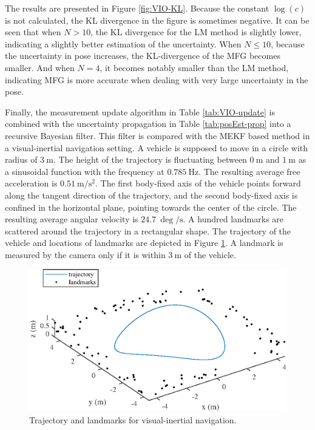 The results are presented in Figure \ref{fig:VIO-KL}.
Because the constant $\log(c)$ is not calculated, the KL divergence in the figure is sometimes negative.
It can be seen that when $N>10$, the KL divergence for the LM method is slightly lower, indicating a slightly better estimation of the uncertainty.
When $N \leq 10$, because the uncertainty in pose increases, the KL-divergence of the MFG becomes smaller.
And when $N=4$, it becomes notably smaller than the LM method, indicating MFG is more accurate when dealing with very large uncertainty in the pose.

Finally, the measurement update algorithm in Table \ref{tab:VIO-update} is combined with the uncertainty propagation in Table \ref{tab:posEst-prop} into a recursive Bayesian filter.
This filter is compared with the MEKF based method in a visual-inertial navigation setting.
A vehicle is supposed to move in a circle with radius of $\SI{3}{\meter}$.
The height of the trajectory is fluctuating between $\SI{0}{\meter}$ and $\SI{1}{\meter}$ as a sinusoidal function with the frequency at $\SI{0.785}{\hertz}$.
The resulting average free acceleration is $\SI{0.51}{\meter/\second\squared}$.
The first body-fixed axis of the vehicle points forward along the tangent direction of the trajectory, and the second body-fixed axis is confined in the horizontal plane, pointing towards the center of the circle.
The resulting average angular velocity is $\SI{24.7}{\deg/\second}$.
A hundred landmarks are scattered around the trajectory in a rectangular shape.
The trajectory of the vehicle and locations of landmarks are depicted in Figure \ref{fig:VIO-trajectory}.
A landmark is measured by the camera only if it is within $\SI{3}{\meter}$ of the vehicle.

\begin{figure}
	\centering
	\includegraphics{figures/VIO-trajectory}
	\caption{Trajectory and landmarks for visual-inertial navigation.}
	\label{fig:VIO-trajectory}
\end{figure}

